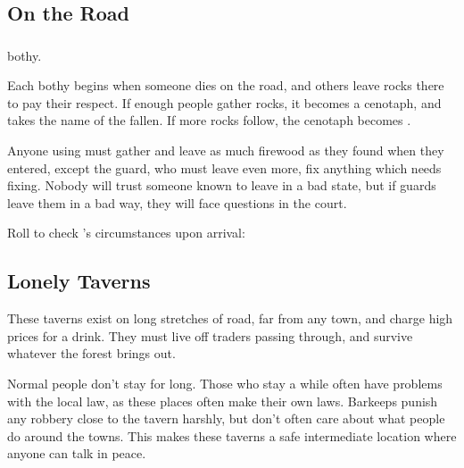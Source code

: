 \begin{multicols}{2}

\subsection{On the Road}

\subsubsection{}
\glsdesc{bothy}.

Each \gls{bothy} begins when someone dies on the road, and others leave rocks there to pay their respect.
If enough people gather rocks, it becomes a cenotaph, and takes the name of the fallen.
If more rocks follow, the cenotaph becomes .

Anyone using  must gather and leave as much firewood as they found when they entered, except the \gls{guard}, who must leave even more, fix anything which needs fixing.
Nobody will trust someone known to leave  in a bad state, but if \glspl{guard} leave them in a bad way, they will face questions in the \gls{court}.

Roll to check 's circumstances upon arrival:

\bothyEvents

\needspace{18em}
\subsubsection{}
\label{villageEvents}

\encVillageEvent

\subsection{Lonely Taverns}
\label{lonelyTaverns}

These taverns exist on long stretches of road, far from any town, and
charge high prices for a drink. They must live off traders passing
through, and survive whatever the forest brings out.

Normal people don't stay for long.
Those who stay a while often have problems with the local
law, as these places often make their own laws.
Barkeeps punish any robbery close to the tavern harshly, but don't often care about what people do around the towns.
This makes these taverns a safe intermediate location where anyone can talk in peace.


\end{multicols}
